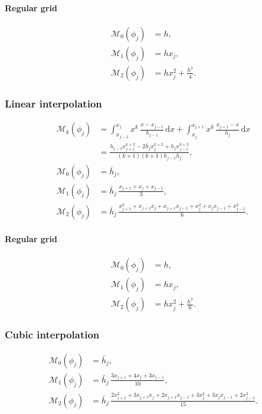 \documentclass[a4paper]{paper}
\newcommand*{\OP}[1]{{\ensuremath{\mathcal{#1}}}}
\newcommand*{\OPM}{\OP{M}}
\newcommand*{\D}{{\ensuremath{\mathrm{d}}}}
\begin{document}
\paragraph{Regular grid}

\begin{align*}
 \OPM_0(\phi_j) &= h, \\
 \OPM_1(\phi_j) &= h x_j, \\
 \OPM_2(\phi_j) &= h x_j^2 +  \frac{h^3}{4}.
\end{align*}


\subsubsection{Linear interpolation}
\label{subsubsec:specif:moments:linear}

\begin{align*}
 \OPM_k(\phi_j) 
 &= \int_{x_{j-1}}^{x_j} x^k\, \frac{x-x_{j-1}}{h_{j-1}}\, \D x + \int_{x_j}^{x_{j+1}} x^k\, \frac{x_{j+1}-x}{h_j}\, 
 \D x \\  
 &= \frac{h_{j-1} x_{j+1}^{k+2} - 2\bar h_j x_j^{k+2} + h_j x_{j-1}^{k+2}}{(k+1)(k+1) h_{j-1} h_j},
 \\
 \OPM_0(\phi_j) & = \bar h_j, \\
 \OPM_1(\phi_j) &= \bar h_j\, \frac{x_{j+1} + x_j + x_{j-1}}{3}, \\
 \OPM_2(\phi_j) &= \bar h_j\, \frac{x_{j+1}^2 + x_{j+1}x_j + x_{j+1}x_{j-1} + x_j^2 + x_jx_{j-1} + x_{j-1}^2}{6}.
\end{align*}

\paragraph{Regular grid}

\begin{align*}
 \OPM_0(\phi_j) &= h, \\
 \OPM_1(\phi_j) &= h x_j, \\
 \OPM_2(\phi_j) &= h x_j^2 +  \frac{h^3}{6}.
\end{align*}


\subsubsection{Cubic interpolation}
\label{subsubsec:specif:moments:cubic}

\begin{align*}
 \OPM_0(\phi_j) &= \bar h_j, \\
 \OPM_1(\phi_j) &= \bar h_j\, \frac{3x_{j+1} + 4x_j + 3x_{j-1}}{10}, \\
 \OPM_2(\phi_j) &= \bar h_j\, \frac{2x_{j+1}^2 + 3x_{j+1}x_j + 2x_{j+1}x_{j-1} + 3x_j^2 + 3x_jx_{j-1} + 2x_{j-1}^2}{15}.
\end{align*}
\end{document}
